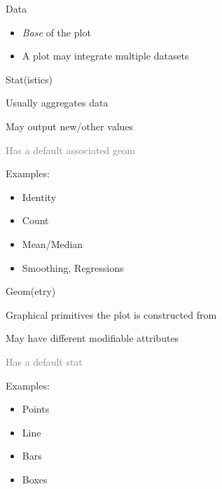 \documentclass[11pt]{beamer}
\newcommand{\gray}[1]{\textcolor{gray}{#1}}
\begin{document}

\begin{frame}{Data}
	\begin{itemize}
		\item \emph{Base} of the plot
		\item A plot may integrate multiple datasets
	\end{itemize}
\end{frame}

\begin{frame}{Stat(istics)}
	\begin{itemize}
		\item Usually aggregates data
		\item May output new/other values
		\gray{\item Has a default associated geom}
			\pause
		\item Examples:
			\pause
			\begin{itemize}
				\item Identity
				\item Count
				\item Mean/Median
				\item Smoothing, Regressions
			\end{itemize}
	\end{itemize}
\end{frame}

\begin{frame}{Geom(etry)}
	\begin{itemize}
		\item Graphical primitives the plot is constructed from
		\item May have different modifiable attributes
		\gray{\item Has a default stat}
			\pause
		\item Examples:
			\pause
			\begin{itemize}
				\item Points
				\item Line
				\item Bars
				\item Boxes
			\end{itemize}
	\end{itemize}
\end{frame}
\end{document}
